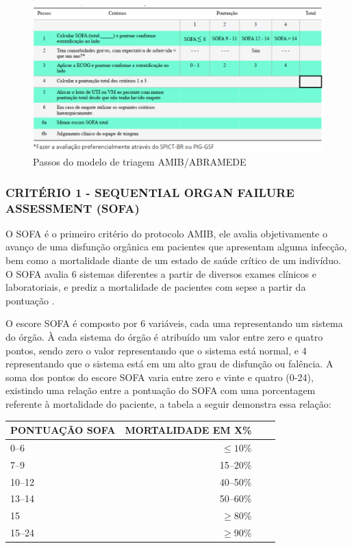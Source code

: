 \documentclass[12pt]{article}
\begin{document}
\begin{figure}[!htb]
    \centering
    \includegraphics[scale=0.5]{img/Tabela de pontuacoes e criterios.png}
    \centering
    \caption{Passos do modelo de triagem AMIB/ABRAMEDE \cite{kretzer2020recomendaccoes}}
    \label{Passos-modelo-triagem-AMIB-ABRAMEDE}
\end{figure}

\clearpage

\subsubsection{CRITÉRIO 1 - SEQUENTIAL ORGAN FAILURE ASSESSMENT (SOFA)}

O SOFA é o primeiro critério do protocolo AMIB, ele avalia objetivamente o avanço de uma disfunção orgânica em pacientes que apresentam alguma infecção, bem como a mortalidade diante de um estado de saúde crítico de um indivíduo.
O SOFA avalia 6 sistemas diferentes a partir de diversos exames clínicos e laboratoriais, e prediz a mortalidade de pacientes com sepse a partir da pontuação \cite{lambden2019sofa}.

O escore SOFA é composto por 6 variáveis, cada uma representando um sistema do órgão. À cada sistema do órgão é atribuído um valor entre zero e quatro pontos, sendo zero o valor representando que o sistema está normal, e 4 representando que o sistema está em um alto grau de disfunção ou falência. A soma dos pontos do escore SOFA varia entre zero e vinte e quatro (0-24), existindo uma relação entre a pontuação do SOFA com uma porcentagem referente à mortalidade do paciente, a tabela a seguir demonstra essa relação:

\begin{center}
    \begin{tabular}{l r r r}
        \hline
        PONTUAÇÃO SOFA & MORTALIDADE EM X\% \\
        \hline
            0–6	& $\leq 10$\% \\
            7–9	& 15–20\% \\
            10–12 & 40–50\% \\
            13–14 & 50–60\% \\
            15 & $\geq80$\% \\
            15–24 & $\geq90$\% \\
        \hline
    \end{tabular}
\end{center}
\end{document}
